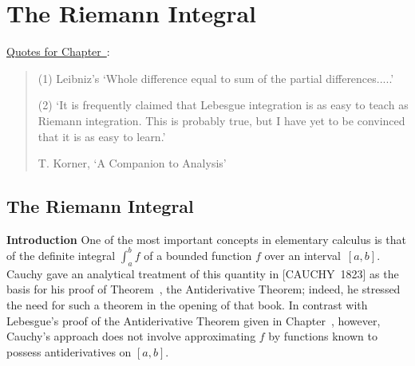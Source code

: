 %
%


                  \chapter{The Riemann Integral}
                  \label{ChaptH}

       \underline{Quotes for Chapter~}:

\V

\begin{quotation}
{\footnotesize
        (1) Leibniz's `Whole difference equal to sum of the partial differences.....'
\V

        (2) `It is frequently claimed that Lebesgue integration is as easy to teach as Riemann integration.
    This is probably true, but I have yet to be convinced that it is as easy to learn.'

        T. Korner, `A Companion to Analysis'

}%
\end{quotation}



\VV

        \section{{\bf The Riemann Integral}}
        \label{SectH20}

\V

        {\bf Introduction} One of the most important concepts in elementary calculus is that of the definite integral
    ${\displaystyle \int_{a}^{b} f}$ of a bounded function $f$ over an interval~$[a,b]$.
    Cauchy gave an analytical treatment of this quantity in [CAUCHY~1823] as the basis for his proof of Theorem~, the Antiderivative Theorem;
    indeed, he stressed the need for such a theorem in the opening of that book. In contrast with Lebesgue's proof of the Antiderivative Theorem given in 
    Chapter~, however, Cauchy's approach does not involve approximating $f$ by functions known to possess antiderivatives on $[a,b]$.

